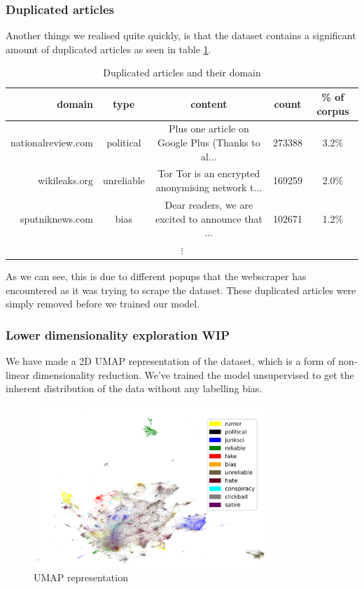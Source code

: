 \subsubsection{Duplicated articles}\label{sec:dup_articles}
Another things we realised quite quickly, is that the dataset contains a significant amount of duplicated articles as
seen in table \ref{tab:dupart}.

\begin{table}[htpb]
  \centering
  \caption{Duplicated articles and their domain}
  \label{tab:dupart}
  \begin{tabular}{r | c | c| c| c}
      domain & type & content & count&\% of corpus \\ \hline
      nationalreview.com & political & Plus one article on Google Plus (Thanks to al... & 273388 & 3.2\%\\ \hline
      wikileaks.org & unreliable & Tor Tor is an encrypted anonymising network t... & 169259 & 2.0\% \\ \hline
      sputniknews.com & bias & Dear readers, we are excited to announce that ... & 102671 & 1.2\%\\
    \multicolumn{5}{c}{$\vdots$}
  \end{tabular}
\end{table}
As we can see, this is due to different popups that the webscraper has encountered as it
was trying to scrape the dataset. These duplicated articles were simply removed before we trained our model.

\subsubsection{Lower dimensionality exploration WIP}
We have made a 2D UMAP representation of the dataset, which is a form of non-linear dimensionality reduction. We've
trained the model unsupervised to get the inherent distribution of the data without any labelling bias.
\begin{figure}[htpb]
  \centering
  \includegraphics[width=0.8\textwidth]{figures/umapFakeNewsClasses}
  \caption{UMAP representation}
  \label{fig:umap_explore}
\end{figure}


